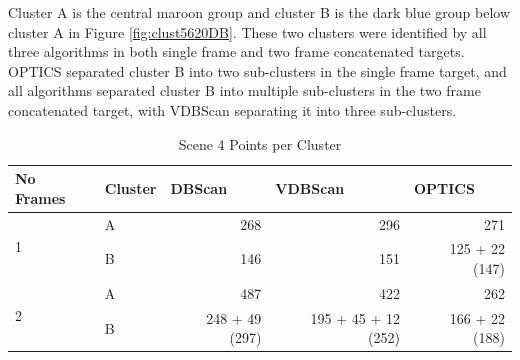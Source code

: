Cluster A is the central maroon group and cluster B is the dark blue group below cluster A in Figure \ref{fig:clust5620DB}. These two clusters were identified by all three algorithms in both single frame and two frame concatenated targets. \ac{OPTICS} separated cluster B into two sub-clusters in the single frame target, and all algorithms separated cluster B into multiple sub-clusters in the two frame concatenated target, with \ac{VDBScan} separating it into three sub-clusters.

\begin{table}[H]
\centering
\begin{tabular}{|l|l|r|r|r|}
\hline
\textbf{No Frames} & \textbf{Cluster} & \multicolumn{1}{l|}{\textbf{DBScan}} & \multicolumn{1}{l|}{\textbf{VDBScan}} & \multicolumn{1}{l|}{\textbf{OPTICS}} \\ \hline
\multirow{2}{*}{1} & A                & 268                                  & 296                                   & 271                                  \\ \cline{2-5} 
                   & B                & 146                                  & 151                                   & 125 + 22 (147)                       \\ \hline
\multirow{2}{*}{2} & A                & 487                                  & 422                                   & 262                                  \\ \cline{2-5} 
                   & B                & 248 + 49 (297)                       & 195 + 45 + 12 (252)                   & 166 + 22 (188)                        \\ \hline
\end{tabular}
\caption{Scene 4 Points per Cluster}
\label{tab:5620Clust}
\end{table}



